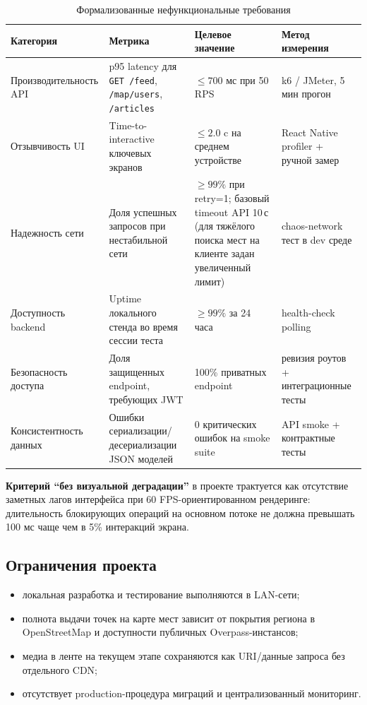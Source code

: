 \documentclass[12pt,a4paper]{article}
\newcommand{\code}[1]{{\small\texttt{#1}}}
\begin{document}
\begin{table}[H]
\centering
\small
\caption{Формализованные нефункциональные требования}
\label{tab:nfr}
\begin{tabular}{|L{0.19\textwidth}|L{0.30\textwidth}|L{0.24\textwidth}|L{0.20\textwidth}|}
\hline
\textbf{Категория} & \textbf{Метрика} & \textbf{Целевое значение} & \textbf{Метод измерения} \\
\hline
Производительность API & p95 latency для \code{GET /feed}, \code{/map/users}, \code{/articles} & \(\leq 700\) мс при 50 RPS & k6 / JMeter, 5 мин прогон \\
\hline
Отзывчивость UI & Time-to-interactive ключевых экранов & \(\leq 2.0\) c на среднем устройстве & React Native profiler + ручной замер \\
\hline
Надежность сети & Доля успешных запросов при нестабильной сети & \(\geq 99\%\) при retry=1; базовый timeout API 10\,с (для тяжёлого поиска мест на клиенте задан увеличенный лимит) & chaos-network тест в dev среде \\
\hline
Доступность backend & Uptime локального стенда во время сессии теста & \(\geq 99\%\) за 24 часа & health-check polling \\
\hline
Безопасность доступа & Доля защищенных endpoint, требующих JWT & 100\% приватных endpoint & ревизия роутов + интеграционные тесты \\
\hline
Консистентность данных & Ошибки сериализации/десериализации JSON моделей & 0 критических ошибок на smoke suite & API smoke + контрактные тесты \\
\hline
\end{tabular}
\end{table}

\textbf{Критерий \enquote{без визуальной деградации}} в проекте трактуется как отсутствие заметных лагов интерфейса при 60 FPS-ориентированном рендеринге: длительность блокирующих операций на основном потоке не должна превышать 100 мс чаще чем в 5\% интеракций экрана.

\subsection{Ограничения проекта}

\begin{itemize}
  \item локальная разработка и тестирование выполняются в LAN-сети;
  \item полнота выдачи точек на карте мест зависит от покрытия региона в OpenStreetMap и доступности публичных Overpass-инстансов;
  \item медиа в ленте на текущем этапе сохраняются как URI/данные запроса без отдельного CDN;
  \item отсутствует production-процедура миграций и централизованный мониторинг.
\end{itemize}
\end{document}
